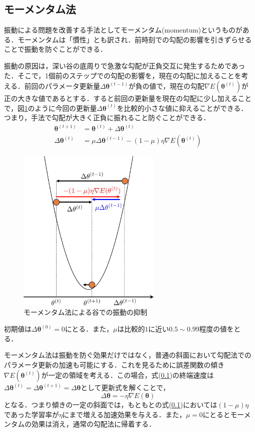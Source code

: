 \documentclass[a4paper,11pt]{jsreport}
\begin{document}
\subsection{モーメンタム法}
振動による問題を改善する手法としてモーメンタム(momentum)というものがある．モーメンタムは「慣性」とも訳され．前時刻での勾配の影響を引きずらせることで振動を防ぐことができる．\par
振動の原因は，深い谷の底周りで急激な勾配が正負交互に発生するためであった．そこで，1個前のステップでの勾配の影響を，現在の勾配に加えることを考える．前回のパラメータ更新量$\Delta \bm{\theta}^{(t-1)}$が負の値で，現在の勾配$\nabla E(\bm{\theta}^{(t)})$が正の大きな値であるとする．すると前回の更新量を現在の勾配に少し加えることで，図\ref{モーメンタム法による勾配抑制図}のように今回の更新量$\Delta \bm{\theta}^{(t)}$を比較的小さな値に抑えることができる．つまり，手法で勾配が大きく正負に振れること防ぐことができる．
\begin{align}
  \bm{\theta}^{(t+1)}
   & = \bm{\theta}^{(t)} + \Delta \bm{\theta}^{(t)}                              \\
  \Delta \bm{\theta}^{(t)}
   & = \mu \Delta \bm{\theta}^{(t-1)} - (1-\mu) \eta \nabla E(\bm{\theta}^{(t)})
\end{align}
\begin{figure}
  \begin{center}
    \includegraphics[height=8cm]{image/モーメンタム法.png}
    \caption{モーメンタム法による谷での振動の抑制}
    \label{モーメンタム法による勾配抑制図}
  \end{center}
\end{figure}
初期値は$\Delta \bm{\theta}^{(0)} = 0$にとる．また，$\mu$は比較的$1$に近い$0.5 \sim 0.99$程度の値をとる．\par
モーメンタム法は振動を防ぐ効果だけではなく，普通の斜面において勾配法でのパラメータ更新の加速も可能にする．これを見るために誤差関数の傾き$\nabla E(\bm{\theta}^{(t)})$が一定の領域を考える．この場合，式(\ref{})の終端速度は$\Delta \bm{\theta}^{(t)} = \Delta \bm{\theta}^{(t+1)} = \Delta \bm{\theta}$として更新式を解くことで，
\begin{equation}
  \Delta \bm{\theta} = -\eta \nabla E(\bm{\theta})
\end{equation}
となる．つまり傾きの一定の斜面では，もともとの式(\ref{})においては$(1-\mu)\eta$であった学習率が$\eta$にまで増える加速効果を与える．また，$\mu=0$にとるとモーメンタムの効果は消え，通常の勾配法に帰着する．
\end{document}
